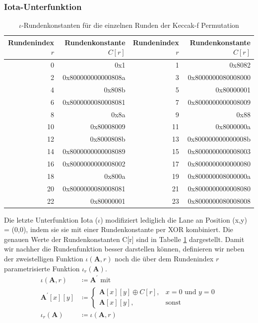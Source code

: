 \subsubsection{Iota-Unterfunktion}
\begin{table}
	\centering
	\begin{tabular}{rrrr}
		Rundenindex $r$ & Rundenkonstante $C[r]$ & Rundenindex $r$ & Rundenkonstante $C[r]$\\
		\hline
		 0 & 0x1 &
		 1 & 0x8082\\
		 2 & 0x800000000000808a &
		 3 & 0x8000000080008000\\
		 4 & 0x808b &
		 5 & 0x80000001\\
		 6 & 0x8000000080008081 &
		 7 & 0x8000000000008009\\
		 8 & 0x8a &
		 9 & 0x88\\
		10 & 0x80008009 &
		11 & 0x8000000a\\
		12 & 0x8000808b &
		13 & 0x800000000000008b\\
		14 & 0x8000000000008089 &
		15 & 0x8000000000008003\\
		16 & 0x8000000000008002 &
		17 & 0x8000000000000080\\
		18 & 0x800a &
		19 & 0x800000008000000a\\
		20 & 0x8000000080008081 &
		21 & 0x8000000000008080\\
		22 & 0x80000001 &
		23 & 0x8000000080008008
	\end{tabular}
	\caption{$\iota$-Rundenkonstanten für die einzelnen Runden der Keccak-f Permutation}
	\label{tab:rundenkonstanten}
\end{table}
Die letzte Unterfunktion Iota ($\iota$) modifiziert lediglich die Lane an Position (x,y) = (0,0), indem sie sie mit einer Rundenkonstante per XOR kombiniert.
Die genauen Werte der Rundenkonstanten C[r] sind in Tabelle \ref{tab:rundenkonstanten} dargestellt.
Damit wir nachher die Rundenfunktion besser darstellen können, definieren wir neben der zweistelligen Funktion
$\iota (\textbf{A}, r)$ noch die über dem Rundenindex $r$ parametrisierte Funktion $\iota_r (\textbf{A})$.
\begin{align*}
    \iota (\textbf{A}, r) & \coloneq \textbf{A}^\prime \text{ mit } \\
    \textbf{A}^\prime[x][y] & \coloneq
    \begin{cases}
        \textbf{A}[x][y] \oplus C[r], & x = 0 \text{ und } y = 0 \\
        \textbf{A}[x][y], & \text{sonst}
    \end{cases} \\
    \iota_r (\textbf{A}) & \coloneq \iota(\textbf{A}, r)
\end{align*}



